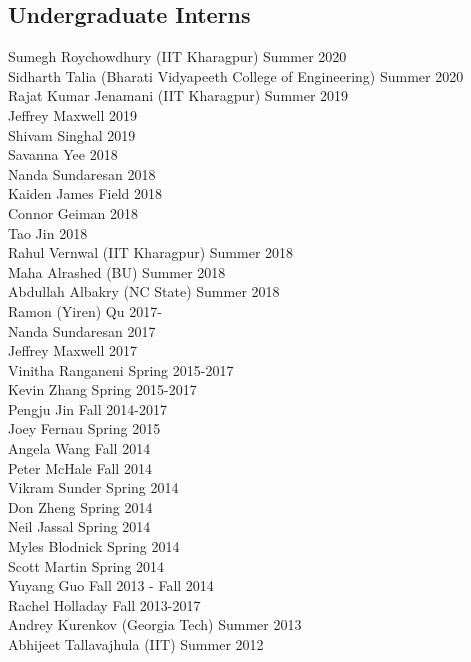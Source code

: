 \subsection{Undergraduate Interns}
\noindent
Sumegh Roychowdhury (IIT Kharagpur) \hfill Summer 2020 \\
Sidharth Talia (Bharati Vidyapeeth College of Engineering) \hfill Summer 2020 \\
Rajat Kumar Jenamani (IIT Kharagpur) \hfill Summer 2019\\
Jeffrey Maxwell \hfill 2019\\
Shivam Singhal \hfill 2019\\
Savanna Yee \hfill 2018\\
Nanda Sundaresan \hfill 2018\\
Kaiden James Field \hfill 2018\\
Connor Geiman \hfill 2018\\
Tao Jin \hfill 2018	\\
Rahul Vernwal (IIT Kharagpur) \hfill Summer 2018\\
Maha Alrashed (BU) \hfill Summer 2018\\
Abdullah Albakry (NC State) \hfill Summer 2018\\
Ramon (Yiren) Qu \hfill 2017-\\
Nanda Sundaresan \hfill 2017\\
Jeffrey Maxwell \hfill 2017\\
Vinitha Ranganeni \hfill Spring 2015-2017\\
Kevin Zhang  \hfill Spring 2015-2017\\
Pengju Jin  \hfill Fall 2014-2017\\
Joey Fernau  \hfill Spring 2015\\
Angela Wang  \hfill Fall 2014\\
Peter McHale  \hfill Fall 2014\\
Vikram Sunder  \hfill Spring 2014\\
Don Zheng  \hfill Spring 2014\\
Neil Jassal  \hfill Spring 2014\\
Myles Blodnick  \hfill Spring 2014\\
Scott Martin  \hfill Spring 2014\\
Yuyang Guo  \hfill Fall 2013 - Fall 2014\\
Rachel Holladay  \hfill Fall 2013-2017\\
Andrey Kurenkov (Georgia Tech) \hfill Summer 2013\\ 
Abhijeet Tallavajhula (IIT) \hfill Summer 2012\\
